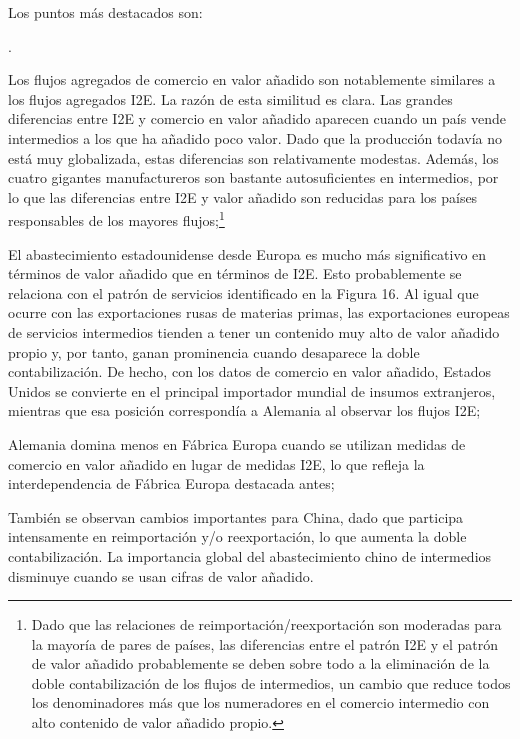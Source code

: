 \documentclass[10pt,a4paper]{article}
\newcounter{numitem}
\newenvironment{lnum}
      {\begin{list}{\arabic{numitem}.}{%
          \usecounter{numitem}%
          \setlength{\leftmargin}{1cm}%
          \setlength{\parskip}{3pt}%
          \setlength{\itemsep}{0pt}%
          \setlength{\parsep}{0pt}%
      }}
      {\end{list}}
\begin{document}
Los puntos más destacados son:
\begin{lnum}
    \item Los flujos agregados de comercio en valor añadido son notablemente similares a los flujos agregados I2E. La razón de esta similitud es clara. Las grandes diferencias entre I2E y comercio en valor añadido aparecen cuando un país vende intermedios a los que ha añadido poco valor. Dado que la producción todavía no está muy globalizada, estas diferencias son relativamente modestas. Además, los cuatro gigantes manufactureros son bastante autosuficientes en intermedios, por lo que las diferencias entre I2E y valor añadido son reducidas para los países responsables de los mayores flujos;\footnote{%
        Dado que las relaciones de reimportación/reexportación son moderadas para la mayoría de pares de países, las diferencias entre el patrón I2E y el patrón de valor añadido probablemente se deben sobre todo a la eliminación de la doble contabilización de los flujos de intermedios, un cambio que reduce todos los denominadores más que los numeradores en el comercio intermedio con alto contenido de valor añadido propio.
    }
    \item El abastecimiento estadounidense desde Europa es mucho más significativo en términos de valor añadido que en términos de I2E. Esto probablemente se relaciona con el patrón de servicios identificado en la Figura 16. Al igual que ocurre con las exportaciones rusas de materias primas, las exportaciones europeas de servicios intermedios tienden a tener un contenido muy alto de valor añadido propio y, por tanto, ganan prominencia cuando desaparece la doble contabilización. De hecho, con los datos de comercio en valor añadido, Estados Unidos se convierte en el principal importador mundial de insumos extranjeros, mientras que esa posición correspondía a Alemania al observar los flujos I2E;
    \item Alemania domina menos en Fábrica Europa cuando se utilizan medidas de comercio en valor añadido en lugar de medidas I2E, lo que refleja la interdependencia de Fábrica Europa destacada antes;
    \item También se observan cambios importantes para China, dado que participa intensamente en reimportación y/o reexportación, lo que aumenta la doble contabilización. La importancia global del abastecimiento chino de intermedios disminuye cuando se usan cifras de valor añadido.
\end{lnum}
\end{document}
